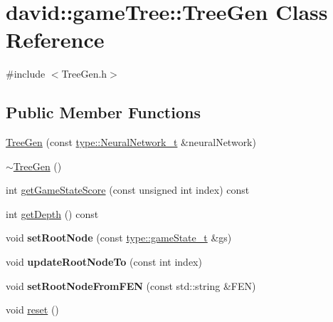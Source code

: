 \hypertarget{classdavid_1_1gameTree_1_1TreeGen}{}\section{david\+:\+:game\+Tree\+:\+:Tree\+Gen Class Reference}
\label{classdavid_1_1gameTree_1_1TreeGen}


{\ttfamily \#include $<$Tree\+Gen.\+h$>$}

\subsection*{Public Member Functions}
\begin{DoxyCompactItemize}
\item 
\hyperlink{classdavid_1_1gameTree_1_1TreeGen_a83ab2152e0a57671f7b38a0c24c2bb3b}{Tree\+Gen} (const \hyperlink{classdavid_1_1ANN}{type\+::\+Neural\+Network\+\_\+t} \&neural\+Network)
\item 
\hyperlink{classdavid_1_1gameTree_1_1TreeGen_ad9d485261d15b5837e4aec4d46912ad5}{$\sim$\+Tree\+Gen} ()
\item 
int \hyperlink{classdavid_1_1gameTree_1_1TreeGen_ae5b4ec70914ac495f83199db48f9a475}{get\+Game\+State\+Score} (const unsigned int index) const
\item 
int \hyperlink{classdavid_1_1gameTree_1_1TreeGen_aeaa5e74a9a71ea62b3cab50c245aa46c}{get\+Depth} () const
\item 
\mbox{\label{classdavid_1_1gameTree_1_1TreeGen_ad775b50fae0171d712c227a3aa69e972}} 
void {\bfseries set\+Root\+Node} (const \hyperlink{structdavid_1_1bitboard_1_1gameState}{type\+::game\+State\+\_\+t} \&gs)
\item 
\mbox{\label{classdavid_1_1gameTree_1_1TreeGen_a1bedef028d98003b7da32dcfccbcf154}} 
void {\bfseries update\+Root\+Node\+To} (const int index)
\item 
\mbox{\label{classdavid_1_1gameTree_1_1TreeGen_af00bca995593806cb50e62a642869361}} 
void {\bfseries set\+Root\+Node\+From\+F\+EN} (const std\+::string \&F\+EN)
\item 
void \hyperlink{classdavid_1_1gameTree_1_1TreeGen_a3fdea406aba77b0553ebf507dc73c1b8}{reset} ()
\item 
\mbox{\label{classdavid_1_1gameTree_1_1TreeGen_a10d0e11d7bd9fb8a0bd0425df46a0e6b}} 

\end{DoxyCompactItemize}
